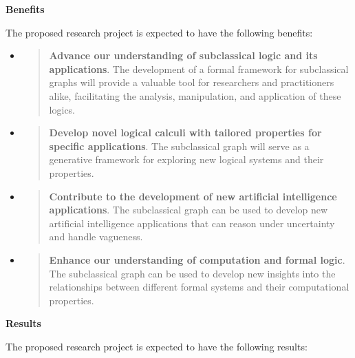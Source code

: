 \textbf{Benefits}

The proposed research project is expected to have the following
benefits:

\begin{itemize}
\item
  \begin{quote}
  \textbf{Advance our understanding of subclassical logic and its
  applications}. The development of a formal framework for subclassical
  graphs will provide a valuable tool for researchers and practitioners
  alike, facilitating the analysis, manipulation, and application of
  these logics.
  \end{quote}
\item
  \begin{quote}
  \textbf{Develop novel logical calculi with tailored properties for
  specific applications}. The subclassical graph will serve as a
  generative framework for exploring new logical systems and their
  properties.
  \end{quote}
\item
  \begin{quote}
  \textbf{Contribute to the development of new artificial intelligence
  applications}. The subclassical graph can be used to develop new
  artificial intelligence applications that can reason under uncertainty
  and handle vagueness.
  \end{quote}
\item
  \begin{quote}
  \textbf{Enhance our understanding of computation and formal logic}.
  The subclassical graph can be used to develop new insights into the
  relationships between different formal systems and their computational
  properties.
  \end{quote}
\end{itemize}

\textbf{Results}

The proposed research project is expected to have the following results:

